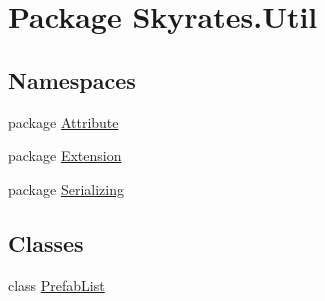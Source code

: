 \hypertarget{namespace_skyrates_1_1_util}{\section{Package Skyrates.\-Util}
\label{namespace_skyrates_1_1_util}
}
\subsection*{Namespaces}
\begin{DoxyCompactItemize}
\item 
package \hyperlink{namespace_skyrates_1_1_util_1_1_attribute}{Attribute}
\item 
package \hyperlink{namespace_skyrates_1_1_util_1_1_extension}{Extension}
\item 
package \hyperlink{namespace_skyrates_1_1_util_1_1_serializing}{Serializing}
\end{DoxyCompactItemize}
\subsection*{Classes}
\begin{DoxyCompactItemize}
\item 
class \hyperlink{class_skyrates_1_1_util_1_1_prefab_list}{Prefab\-List}
\end{DoxyCompactItemize}
